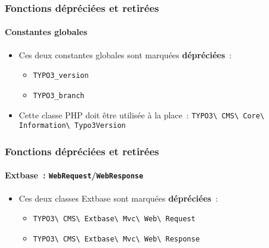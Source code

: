 
\begin{frame}[fragile]
	\frametitle{Fonctions dépréciées et retirées}
	\framesubtitle{Constantes globales}

	\lstset{basicstyle=\smaller\ttfamily}

	\begin{itemize}
		\item Ces deux constantes globales sont marquées \textbf{dépréciées}~:

			\begin{itemize}
				\item \texttt{TYPO3\_version}
				\item \texttt{TYPO3\_branch}
			\end{itemize}

		\item Cette classe PHP doit être utilisée à la place~:\newline
			\small
				\texttt{TYPO3\textbackslash
					CMS\textbackslash
					Core\textbackslash
					Information\textbackslash
					Typo3Version}\normalsize

	\end{itemize}

\end{frame}


\begin{frame}[fragile]
	\frametitle{Fonctions dépréciées et retirées}
	\framesubtitle{Extbase~: \texttt{WebRequest}/\texttt{WebResponse}}

	\begin{itemize}
		\item Ces deux classes Extbase sont marquées \textbf{dépréciées}~:
			\begin{itemize}
				\item \texttt{TYPO3\textbackslash
					CMS\textbackslash
					Extbase\textbackslash
					Mvc\textbackslash
					Web\textbackslash
					Request}
				\item \texttt{TYPO3\textbackslash
					CMS\textbackslash
					Extbase\textbackslash
					Mvc\textbackslash
					Web\textbackslash
					Response}
			\end{itemize}

	\end{itemize}

\end{frame}

